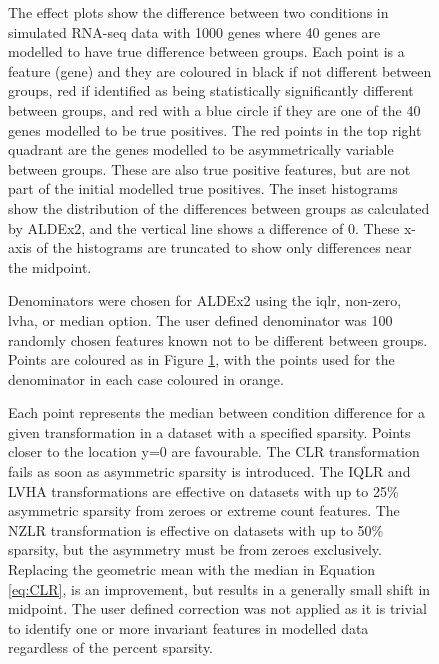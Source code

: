 \documentclass{bmcart}
\def\texttt{[image: ]}
\begin{document}
\begin{backmatter}
\begin{figure}[h!]
\caption{ The effect plots show the difference between two conditions in simulated RNA-seq data with 1000 genes where 40 genes are modelled to have true difference between groups. Each point is a feature (gene) and they are coloured in black if not different between groups, red if identified as being statistically significantly different between groups, and red with a blue circle if they are one of the 40  genes modelled to be  true positives. The red points in the top right quadrant are the genes modelled to be asymmetrically variable between groups. These are also true positive features, but are not part of the initial modelled true positives. The inset histograms show the distribution of the differences between groups as calculated by ALDEx2, and the vertical line shows a difference of 0. These x-axis of the histograms are truncated to show only differences near the midpoint.}
\label{Fig:f1a}
\end{figure}

\begin{figure}[h!]
\caption{ Denominators were chosen for ALDEx2 using the iqlr, non-zero, lvha, or median option. The user defined denominator was 100 randomly chosen features known not to be different between groups. Points are coloured as in Figure \ref{Fig:f1a}, with the points used for the denominator in each case coloured in orange.}
\label{Fig:f2a}
\end{figure}

\begin{figure}[h!]
\caption{ Each point represents the median between condition difference for a given transformation in a dataset with a specified sparsity. Points closer to the location y=0 are favourable. The CLR transformation fails as soon as asymmetric sparsity is introduced. The IQLR and LVHA transformations are effective on datasets with up to 25\% asymmetric sparsity from zeroes or extreme count features. The NZLR transformation is effective on datasets with up to 50\% sparsity, but the asymmetry must be from zeroes exclusively. Replacing the geometric mean with the median in Equation \ref{eq:CLR}, is an improvement, but results in a generally small shift in midpoint. The user defined correction was not applied as it is trivial to identify one or more invariant features in modelled data regardless of the percent sparsity.}
\label{Fig:failure}
\end{figure}


\end{backmatter}
\end{document}
